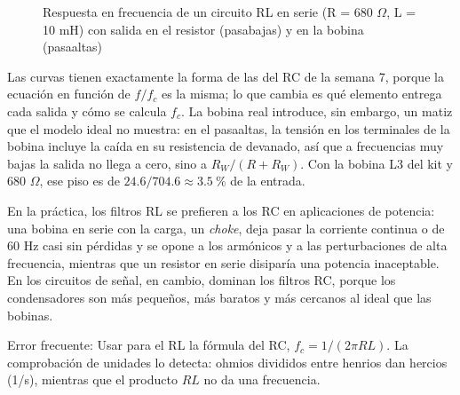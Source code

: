 \documentclass[11pt,letterpaper]{article}
\begin{document}
\begin{figure}[H]
  \caption{Respuesta en frecuencia de un circuito RL en serie (R = 680 \ensuremath{\Omega}, L = 10 mH) con salida en el resistor (pasabajas) y en la bobina (pasaaltas)}
\end{figure}

Las curvas tienen exactamente la forma de las del RC de la semana 7, porque la ecuación en función de $f/f_c$ es la misma; lo que cambia es qué elemento entrega cada salida y cómo se calcula $f_c$. La bobina real introduce, sin embargo, un matiz que el modelo ideal no muestra: en el pasaaltas, la tensión en los terminales de la bobina incluye la caída en su resistencia de devanado, así que a frecuencias muy bajas la salida no llega a cero, sino a $R_W/(R + R_W)$. Con la bobina L3 del kit y 680 \ensuremath{\Omega}, ese piso es de $24.6/704.6 \approx 3.5\ \text{\%}$ de la entrada.

En la práctica, los filtros RL se prefieren a los RC en aplicaciones de potencia: una bobina en serie con la carga, un \textit{choke}, deja pasar la corriente continua o de 60 Hz casi sin pérdidas y se opone a los armónicos y a las perturbaciones de alta frecuencia, mientras que un resistor en serie disiparía una potencia inaceptable. En los circuitos de señal, en cambio, dominan los filtros RC, porque los condensadores son más pequeños, más baratos y más cercanos al ideal que las bobinas.

\begin{nota}{Error frecuente:}
Usar para el RL la fórmula del RC, $f_c = 1/(2\pi R L)$. La comprobación de unidades lo detecta: ohmios divididos entre henrios dan hercios (1/s), mientras que el producto $RL$ no da una frecuencia.
\end{nota}
\end{document}
